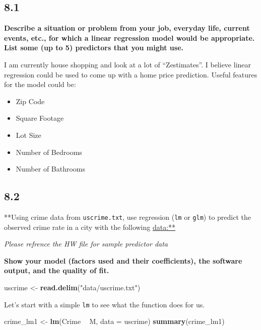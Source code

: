 \documentclass[]{article}
\newenvironment{Shaded}{\begin{snugshade}}{\end{snugshade}}
\newcommand{\KeywordTok}[1]{\textcolor[rgb]{0.13,0.29,0.53}{\textbf{#1}}}
\newcommand{\DataTypeTok}[1]{\textcolor[rgb]{0.13,0.29,0.53}{#1}}
\newcommand{\StringTok}[1]{\textcolor[rgb]{0.31,0.60,0.02}{#1}}
\newcommand{\OperatorTok}[1]{\textcolor[rgb]{0.81,0.36,0.00}{\textbf{#1}}}
\newcommand{\NormalTok}[1]{#1}
\providecommand{\tightlist}{%
  \setlength{\itemsep}{0pt}\setlength{\parskip}{0pt}}
\begin{document}
\subsection{8.1}\label{section-2}

\textbf{Describe a situation or problem from your job, everyday life,
current events, etc., for which a linear regression model would be
appropriate. List some (up to 5) predictors that you might use.}

I am currently house shopping and look at a lot of ``Zestimates''. I
believe linear regression could be used to come up with a home price
prediction. Useful features for the model could be:

\begin{itemize}
\tightlist
\item
  Zip Code
\item
  Square Footage
\item
  Lot Size
\item
  Number of Bedrooms
\item
  Number of Bathrooms
\end{itemize}

\subsection{8.2}\label{section-3}

**Using crime data from \texttt{uscrime.txt}, use regression
(\texttt{lm} or \texttt{glm}) to predict the observed crime rate in a
city with the following \url{data:**}

\emph{Please refrence the HW file for sample predictor data}

\textbf{Show your model (factors used and their coefficients), the
software output, and the quality of fit.}

\begin{Shaded}
\begin{Highlighting}[]
\NormalTok{uscrime <-}\StringTok{ }\KeywordTok{read.delim}\NormalTok{(}\StringTok{"data/uscrime.txt"}\NormalTok{)}
\end{Highlighting}
\end{Shaded}

Let's start with a simple \texttt{lm} to see what the function does for
us.

\begin{Shaded}
\begin{Highlighting}[]
\NormalTok{crime_lm1 <-}\StringTok{ }\KeywordTok{lm}\NormalTok{(Crime }\OperatorTok{~}\StringTok{ }\NormalTok{M, }\DataTypeTok{data =}\NormalTok{ uscrime)}
\KeywordTok{summary}\NormalTok{(crime_lm1)}
\end{Highlighting}
\end{Shaded}
\end{document}
